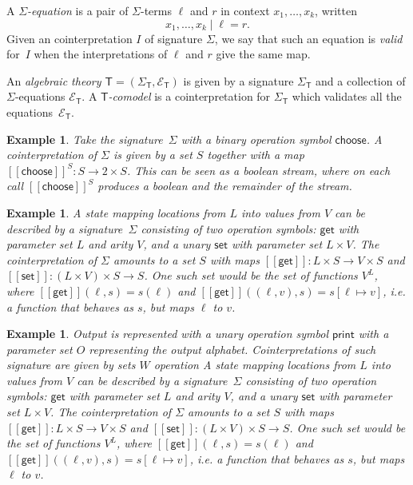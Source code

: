 \documentclass{amsart}
\newcommand{\theory}[1]{\mathsf{#1}} %
\newcommand{\signature}[1]{\Sigma_{\theory{#1}}} %
\newcommand{\equations}[1]{\mathcal{E}_{\theory{#1}}} %
\newcommand{\sem}[1]{[\![#1]\!]} %
\newtheorem{example}[definition]{Example}
\begin{document}
A \emph{$\Sigma$-equation} is a pair of $\Sigma$-terms $\ell$ and $r$ in context $x_1, \ldots, x_k$, written
%
\begin{equation*}
  x_1, \ldots, x_k \mid \ell = r.
\end{equation*}
%
Given an cointerpretation $I$ of signature $\Sigma$, we say that such an equation is \emph{valid} for~$I$ when the interpretations of $\ell$ and $r$ give the same map.

An \emph{algebraic theory $\theory{T} = (\signature{T}, \equations{T})$} is
given by a signature $\signature{T}$ and a collection of $\Sigma$-equations
$\equations{T}$. A \emph{$\theory{T}$-comodel} is a cointerpretation for
$\signature{T}$ which validates all the equations~$\equations{T}$.

\begin{example}
Take the signature~$\Sigma$ with a binary operation symbol $\mathsf{choose}$. A cointerpretation of $\Sigma$ is given by a set $S$ together with a map $\sem{\mathsf{choose}}^S \colon S \to 2 \times S$. This can be seen as a boolean stream, where on each call $\sem{\mathsf{choose}}^S$ produces a boolean and the remainder of the stream.
\end{example}

\begin{example}
A state mapping locations from $L$ into values from $V$ can be described by a signature~$\Sigma$ consisting of two operation symbols: $\mathsf{get}$ with parameter set $L$ and arity $V$, and a unary $\mathsf{set}$ with parameter set $L \times V$. The cointerpretation of $\Sigma$ amounts to a set $S$ with maps $\sem{\mathsf{get}} \colon L \times S \to V \times S$ and $\sem{\mathsf{set}} \colon (L \times V) \times S \to S$. One such set would be the set of functions $V^L$, where $\sem{\mathsf{get}}(\ell, s) = s(\ell)$ and $\sem{\mathsf{get}}((\ell, v), s) = s[\ell \mapsto v]$, i.e. a function that behaves as $s$, but maps $\ell$ to $v$.
\end{example}

\begin{example}
Output is represented with a unary operation symbol $\mathsf{print}$ with a parameter set $O$ representing the output alphabet. Cointerpretations of such signature are given by sets $W$ operation A state mapping locations from $L$ into values from $V$ can be described by a signature~$\Sigma$ consisting of two operation symbols: $\mathsf{get}$ with parameter set $L$ and arity $V$, and a unary $\mathsf{set}$ with parameter set $L \times V$. The cointerpretation of $\Sigma$ amounts to a set $S$ with maps $\sem{\mathsf{get}} \colon L \times S \to V \times S$ and $\sem{\mathsf{set}} \colon (L \times V) \times S \to S$. One such set would be the set of functions $V^L$, where $\sem{\mathsf{get}}(\ell, s) = s(\ell)$ and $\sem{\mathsf{get}}((\ell, v), s) = s[\ell \mapsto v]$, i.e. a function that behaves as $s$, but maps $\ell$ to $v$.
\end{example}
\end{document}
